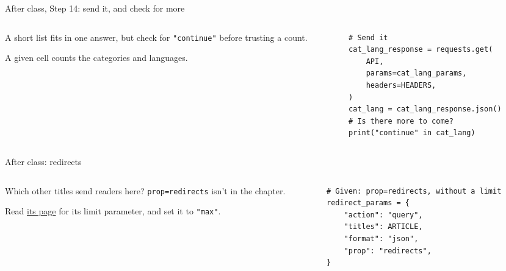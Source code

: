 \documentclass[9pt,aspectratio=169]{beamer}
\begin{document}
\begin{frame}[fragile]{After class, Step 14: send it, and check for more}
    \begin{columns}[T]
        \begin{column}{0.37\textwidth}
            A short list fits in one answer, but check for \texttt{"continue"} before trusting a count.

            \medskip
            A given cell counts the categories and languages.
        \end{column}
        \begin{column}{0.6\textwidth}
\begin{lstlisting}
# Send it
cat_lang_response = requests.get(
    API,
    params=cat_lang_params,
    headers=HEADERS,
)
cat_lang = cat_lang_response.json()
# Is there more to come?
print("continue" in cat_lang)
\end{lstlisting}
        \end{column}
    \end{columns}
\end{frame}

\begin{frame}[fragile]{After class: redirects}
    \begin{columns}[T]
        \begin{column}{0.37\textwidth}
            Which other titles send readers here? \texttt{prop=redirects} isn't in the chapter.

            \medskip
            Read \href{https://www.mediawiki.org/wiki/API:Redirects}{its page} for its limit parameter, and set it to \texttt{"max"}.
        \end{column}
        \begin{column}{0.6\textwidth}
\begin{lstlisting}
# Given: prop=redirects, without a limit
redirect_params = {
    "action": "query",
    "titles": ARTICLE,
    "format": "json",
    "prop": "redirects",
}
\end{lstlisting}
        \end{column}
    \end{columns}
\end{frame}
\end{document}
